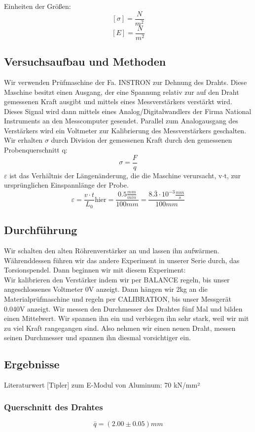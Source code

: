 \documentclass{article}
\begin{document}
Einheiten der Größen:
$$[\sigma]=\frac{N}{m^2}$$
$$[E]=\frac{N}{m^2}$$
\subsection{Versuchsaufbau und Methoden}
Wir verwenden Prüfmaschine der Fa. INSTRON zur Dehnung des Drahts. Diese Maschine besitzt einen Ausgang, der eine Spannung relativ zur auf den Draht gemessenen Kraft ausgibt und mittels eines Messverstärkers verstärkt wird. Dieses Signal wird dann mittels eines Analog/Digitalwandlers der Firma National Instruments an den Messcomputer gesendet. Parallel zum Analogausgang des Verstärkers wird ein Voltmeter zur Kalibrierung des Messverstärkers geschalten.
Wir erhalten $\sigma$ durch Division der gemessenen Kraft durch den gemessenen Probenquerschnitt q:
$$ \sigma = \frac{F}{q}$$
$\varepsilon$ ist das Verhältnis der Längenänderung, die die Maschine verursacht, v$\cdot$t, zur ursprünglichen Einspannlänge der Probe.
$$ \varepsilon = \frac{v\cdot t}{L_0} \text{hier} = \frac{0.5\frac{mm}{min}}{100mm} = \frac{8.\bar{3}\cdot10^{-3}\frac{mm}{s}}{100mm}$$
\subsection{Durchführung}
Wir schalten den alten Röhrenverstärker an und lassen ihn aufwärmen. Währenddessen führen wir das andere Experiment in unserer Serie durch, das Torsionspendel. Dann beginnen wir mit diesem Experiment: \\
Wir kalibrieren den Verstärker indem wir per BALANCE regeln, bis unser angeschlossenes Voltmeter 0V anzeigt. Dann hängen wir 2kg an die Materialprüfmaschine und regeln per CALIBRATION, bis unser Messgerät 0.040V anzeigt.
Wir messen den Durchmesser des Drahtes fünf Mal und bilden einen Mittelwert. Wir spannen ihn ein und verbiegen ihn sehr stark, weil wir mit zu viel Kraft rangegangen sind. Also nehmen wir einen neuen Draht, messen seinen Durchmesser und spannen ihn diesmal vorsichtiger ein.  
\subsection{Ergebnisse}
Literaturwert [Tipler] zum E-Modul von Aluminum: 70 kN/mm²
\subsubsection*{Querschnitt des Drahtes}
$$\bar{q}=(2.00 \pm 0.05)mm$$ 
\end{document}
